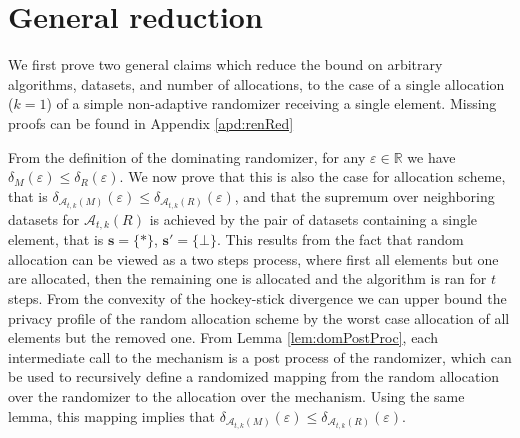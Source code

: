\documentclass{article}
\theoremstyle{plain}
\theoremstyle{definition}
\newcommand{\eps}{\varepsilon}
\newcommand{\reals}{\mathbb{R}}
\newcommand{\alg}{M}
\newcommand{\rand}{R}
\newcommand{\dataset}{\boldsymbol{s}}
\newcommand{\alloc}[2]{\mathcal{A}_{#1}\left(#2\right)}
\newcommand{\privProf}[1]{\delta_{#1}}
\begin{document}
\section{General reduction} \label{sec:renRed}
We first prove two general claims which reduce the bound on arbitrary algorithms, datasets, and number of allocations, to the case of a single allocation ($k=1$) of a simple non-adaptive randomizer receiving a single element. Missing proofs can be found in Appendix \ref{apd:renRed}

From the definition of the dominating randomizer, for any $\eps \in \reals$ we have $\privProf{\alg}(\eps) \le \privProf{\rand}(\eps)$. We now prove that this is also the case for allocation scheme, that is $\privProf{\alloc{t, k}{\alg}}(\eps) \le \privProf{\alloc{t, k}{\rand}}(\eps)$, and that the supremum over neighboring datasets for $\alloc{t, k}{\rand}$ is achieved by the pair of datasets containing a single element, that is $\dataset = \{*\}$, $\dataset' = \{\bot\}$.
This results from the fact that random allocation can be viewed as a two steps process, where first all elements but one are allocated, then the remaining one is allocated and the algorithm is ran for $t$ steps. From the convexity of the hockey-stick divergence we can upper bound the privacy profile of the random allocation scheme by the worst case allocation of all elements but the removed one.
From Lemma \ref{lem:domPostProc}, each intermediate call to the mechanism is a post process of the randomizer, which can be used to recursively define a randomized mapping from the random allocation over the randomizer to the allocation over the mechanism. Using the same lemma, this mapping implies that $\privProf{\alloc{t, k}{\alg}}(\eps) \le \privProf{\alloc{t, k}{\rand}}(\eps)$.
\end{document}
